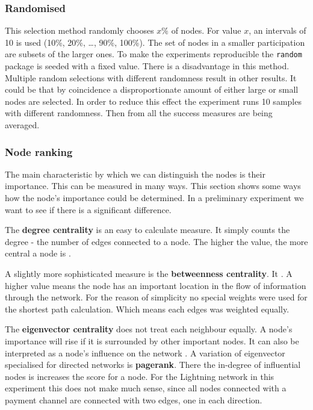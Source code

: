 \documentclass[final]{fhnwreport}       %
\begin{document}
\subsubsection{Randomised}
This selection method randomly chooses $x\%$ of nodes. For value $x$, an intervals of 10 is used (10\%, 20\%, \ldots, 90\%, 100\%). The set of nodes in a smaller participation are subsets of the larger ones. To make the experiments reproducible the \texttt{random} package is seeded with a fixed value. There is a disadvantage in this method. Multiple random selections with different randomness result in other results. It could be that by coincidence a disproportionate amount of either large or small nodes are selected. In order to reduce this effect the experiment runs 10 samples with different randomness. Then from all the success measures are being averaged. 

\subsubsection{Node ranking}
The main characteristic by which we can distinguish the nodes is their importance. This can be measured in many ways. This section shows some ways how the node's importance could be determined. In a preliminary experiment we want to see if there is a significant difference.

The \textbf{degree centrality} is an easy to calculate measure. It simply counts the degree - the number of edges connected to a node. The higher the value, the more central a node is \citep{golbeck_analyzing_2013}.

A slightly more sophisticated measure is the \textbf{betweenness centrality}. It . A higher value means the node has an important location in the flow of information through the network. For the reason of simplicity no special weights were used for the shortest path calculation. Which means each edges was weighted equally.

The \textbf{eigenvector centrality} does not treat each neighbour equally. A node's importance will rise if it is surrounded by other important nodes. It can also be interpreted as a node's influence on the network \citep{golbeck_analyzing_2013}. A variation of eigenvector specialised for directed networks is \textbf{pagerank}. There the in-degree of influential nodes is increases the score for a node. For the Lightning network in this experiment this does not make much sense, since all nodes connected with a payment channel are connected with two edges, one in each direction.
\end{document}
